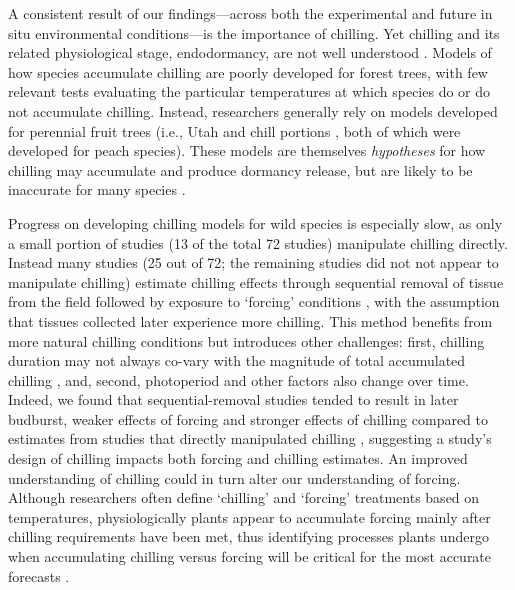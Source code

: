 \documentclass{article}
\begin{document}
\par A consistent result of our findings---across both the experimental and future in situ environmental conditions---is the importance of chilling. Yet chilling and its related physiological stage, endodormancy, are not well understood \citep{chuine2016}. Models of how species accumulate chilling are poorly developed for forest trees, with few relevant tests evaluating the particular temperatures at which species do or do not accumulate chilling. Instead, researchers generally rely on models developed for perennial fruit trees (i.e., Utah \citep{richardson1974} and chill portions \citep{fishman1987}, both of which were developed for peach species). These models are themselves \emph{hypotheses} for how chilling may accumulate and produce dormancy release, but are likely to be inaccurate for many species \citep{dennis2003}. 

\par Progress on developing chilling models for wild species is especially slow, as only a small portion of studies (13 of the total 72 studies) manipulate chilling directly. Instead many studies (25 out of 72; the remaining studies did not not appear to manipulate chilling) estimate chilling effects through sequential removal of tissue from the field followed by exposure to `forcing' conditions \citep{weinberger1950}, with the assumption that tissues collected later experience more chilling. This method benefits from more natural chilling conditions but introduces other challenges: first, chilling duration may not always co-vary with the magnitude of total accumulated chilling \citep{dennis2003}, and, second, photoperiod and other factors also change over time. Indeed, we found that sequential-removal studies tended to result in later budburst, weaker effects of forcing and stronger effects of chilling compared to estimates from studies that directly manipulated chilling \citep[Fig. 4S][]{weinberger1950,polgar2013}, suggesting a study's design of chilling impacts both forcing and chilling estimates. An improved understanding of chilling could in turn alter our understanding of forcing. Although researchers often define `chilling' and `forcing' treatments based on temperatures, physiologically plants appear to accumulate forcing mainly after chilling requirements have been met,  thus identifying processes plants undergo when accumulating chilling versus forcing will be critical for the most accurate forecasts \citep{chuine2016}.
\end{document}

